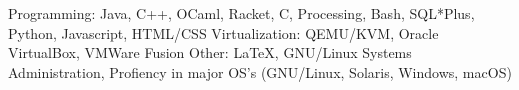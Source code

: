 \begin{cvskills}
    \cvskill
    {Programming:}
    {Java, C++, OCaml, Racket, C, Processing, Bash, SQL*Plus, Python, Javascript, HTML/CSS}
    \cvskill
    {Virtualization:}
    {QEMU/KVM, Oracle VirtualBox, VMWare Fusion}
	\cvskill
	{Other:}
	{LaTeX, GNU/Linux Systems Administration, Profiency in major OS's (GNU/Linux, Solaris, Windows, macOS)}
	\vspace{0em} %
\end{cvskills}
